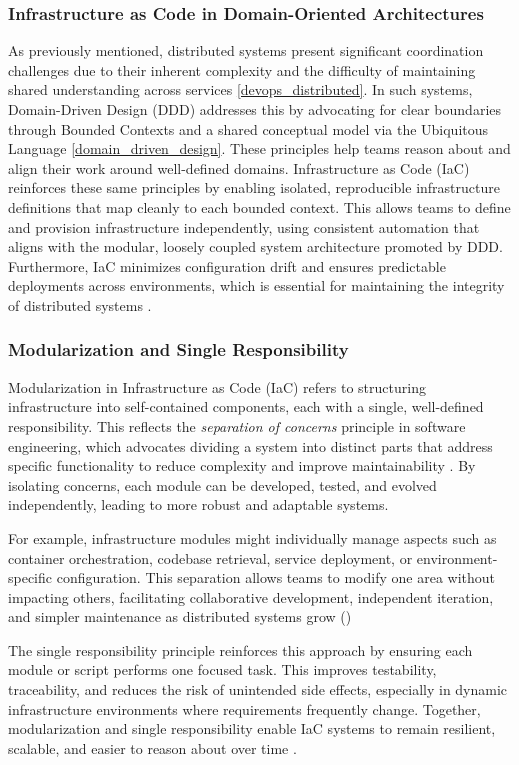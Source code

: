\subsubsection{Infrastructure as Code in Domain-Oriented Architectures}
As previously mentioned, distributed systems present significant coordination challenges due to their inherent complexity and the difficulty of maintaining shared understanding across services \ref{devops_distributed}. In such systems, Domain-Driven Design (DDD) addresses this by advocating for clear boundaries through Bounded Contexts and a shared conceptual model via the Ubiquitous Language \ref{domain_driven_design}. These principles help teams reason about and align their work around well-defined domains. Infrastructure as Code (IaC) reinforces these same principles by enabling isolated, reproducible infrastructure definitions that map cleanly to each bounded context. This allows teams to define and provision infrastructure independently, using consistent automation that aligns with the modular, loosely coupled system architecture promoted by DDD. Furthermore, IaC minimizes configuration drift and ensures predictable deployments across environments, which is essential for maintaining the integrity of distributed systems \citep{morris_2020}.

\subsubsection{Modularization and Single Responsibility} \label{modularization}
Modularization in Infrastructure as Code (IaC) refers to structuring infrastructure into self-contained components, each with a single, well-defined responsibility. This reflects the \textit{separation of concerns} principle in software engineering, which advocates dividing a system into distinct parts that address specific functionality to reduce complexity and improve maintainability \citep{dijkstra1982}. By isolating concerns, each module can be developed, tested, and evolved independently, leading to more robust and adaptable systems.

For example, infrastructure modules might individually manage aspects such as container orchestration, codebase retrieval, service deployment, or environment-specific configuration. This separation allows teams to modify one area without impacting others, facilitating collaborative development, independent iteration, and simpler maintenance as distributed systems grow (\citep{morris_2020})

The single responsibility principle reinforces this approach by ensuring each module or script performs one focused task. This improves testability, traceability, and reduces the risk of unintended side effects, especially in dynamic infrastructure environments where requirements frequently change. Together, modularization and single responsibility enable IaC systems to remain resilient, scalable, and easier to reason about over time \citep{morris_2020}.

